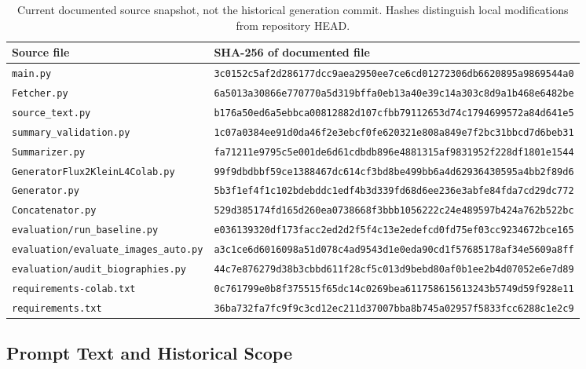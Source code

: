 \begin{table}[t]
\centering
\footnotesize
\begin{tabular}{@{}l@{\quad}l@{}}
\hline
Source file & SHA-256 of documented file \\
\hline
\nolinkurl{main.py} & \nolinkurl{3c0152c5af2d286177dcc9aea2950ee7ce6cd01272306db6620895a9869544a0} \\
\nolinkurl{Fetcher.py} & \nolinkurl{6a5013a30866e770770a5d319bffa0eb13a40e39c14a303c8d9a1b468e6482be} \\
\nolinkurl{source_text.py} & \nolinkurl{b176a50ed6a5ebbca00812882d107cfbb79112653d74c1794699572a84d641e5} \\
\nolinkurl{summary_validation.py} & \nolinkurl{1c07a0384ee91d0da46f2e3ebcf0fe620321e808a849e7f2bc31bbcd7d6beb31} \\
\nolinkurl{Summarizer.py} & \nolinkurl{fa71211e9795c5e001de6d61cdbdb896e4881315af9831952f228df1801e1544} \\
\nolinkurl{GeneratorFlux2KleinL4Colab.py} & \nolinkurl{99f9dbdbbf59ce1388467dc614cf3bd8be499bb6a4d62936430595a4bb2f89d6} \\
\nolinkurl{Generator.py} & \nolinkurl{5b3f1ef4f1c102bdebddc1edf4b3d339fd68d6ee236e3abfe84fda7cd29dc772} \\
\nolinkurl{Concatenator.py} & \nolinkurl{529d385174fd165d260ea0738668f3bbb1056222c24e489597b424a762b522bc} \\
\nolinkurl{evaluation/run_baseline.py} & \nolinkurl{e036139320df173facc2ed2d2f5f4c13e2edefcd0fd75ef03cc9234672bce165} \\
\nolinkurl{evaluation/evaluate_images_auto.py} & \nolinkurl{a3c1ce6d6016098a51d078c4ad9543d1e0eda90cd1f57685178af34e5609a8ff} \\
\nolinkurl{evaluation/audit_biographies.py} & \nolinkurl{44c7e876279d38b3cbbd611f28cf5c013d9bebd80af0b1ee2b4d07052e6e7d89} \\
\nolinkurl{requirements-colab.txt} & \nolinkurl{0c761799e0b8f375515f65dc14c0269bea611758615613243b5749d59f928e11} \\
\nolinkurl{requirements.txt} & \nolinkurl{36ba732fa7fc9f9c3cd12ec211d37007bba8b745a02957f5833fcc6288c1e2c9} \\
\hline
\end{tabular}
\caption{Current documented source snapshot, not the historical generation commit. Hashes distinguish local modifications from repository HEAD.}
\label{tab:code-snapshot}
\end{table}

\subsection{Prompt Text and Historical Scope}

